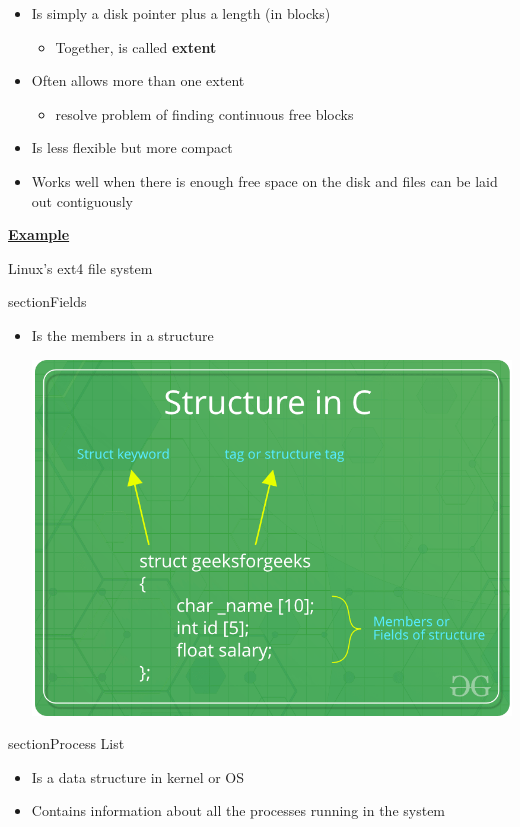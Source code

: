 \documentclass[12pt]{article}
\begin{document}
\begin{itemize}
    \item Is simply a disk pointer plus a length (in blocks)
    \begin{itemize}
        \item Together, is called \textbf{extent}
    \end{itemize}
    \item Often allows more than one extent
    \begin{itemize}
        \item resolve problem of finding continuous free blocks
    \end{itemize}
    \item Is less flexible but more compact
    \item Works well when there is enough free space on the disk and
    files can be laid out contiguously
\end{itemize}

\bigskip

\underline{\textbf{Example}}

\bigskip

Linux's ext4 file system

\*section{Fields}

\begin{itemize}
    \item Is the members in a structure

    \bigskip

    \begin{center}
    \includegraphics[width=0.6\linewidth]{images/midterm_1_solution_15.png}
    \end{center}
\end{itemize}

\*section{Process List}

\begin{itemize}
    \item Is a data structure in kernel or OS
    \item Contains information about all the processes running in the system
\end{itemize}
\end{document}
